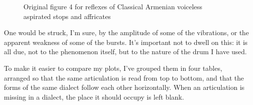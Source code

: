 \begin{figure}
	\centering
	\caption{Original figure 4 for reflexes of Classical Armenian voiceless aspirated stops and affricates}
	\label{fig:fig4 original}
\end{figure}



One would be struck, I'm sure, by the amplitude of some of the vibrations, or the apparent weakness of some of the bursts. It's important not to dwell on this: it is all due, not to the phenomenon itself, but to the nature of the drum I have used.

To make it easier to compare my plots, I've grouped them in four tables, arranged so that the same articulation is read from top to bottom, and that the forms of the same dialect follow each other horizontally. When an articulation is missing in a dialect, the place it should occupy is left blank.

